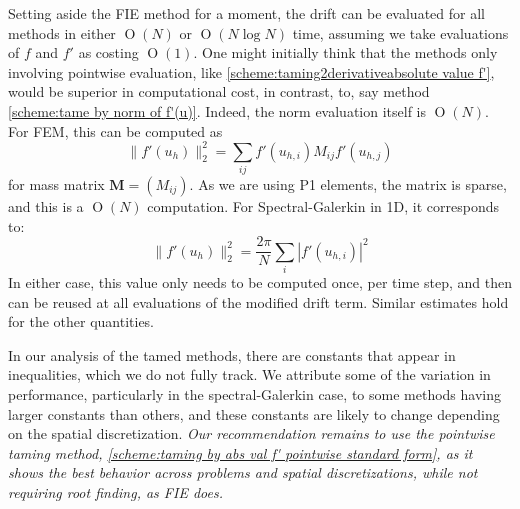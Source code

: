 \documentclass[reqno, 11pt]{amsart}
\newcommand{\gsnote}[1]{\textcolor{Cerulean}{#1}}
\theoremstyle{plain}
\theoremstyle{definition}
\theoremstyle{remark}
\numberwithin{equation}{section}
\numberwithin{theorem}{section}
\DeclareMathOperator{\bigo}{O}
\begin{document}
{Setting aside the FIE method for a moment, the drift can be evaluated for all methods in either $\bigo(N)$ or $\bigo(N\log N)$ time, assuming we take evaluations of $f$ and $f'$ as costing $\bigo(1)$.  One might initially think that the methods only involving pointwise evaluation, like \eqref{scheme:taming2derivativeabsolute value f'}, would be superior in computational cost, in contrast, to, say method \eqref{scheme:tame by norm of f'(u)}.  Indeed, the norm evaluation itself is $\bigo(N)$.  For FEM, this can be computed as
\begin{equation}
    \|f'(u_h)\|_2^2 = \sum_{ij} f'(u_{h,i})M_{ij} f'(u_{h,j})
\end{equation}
for mass matrix $\mathbf{M} = (M_{ij})$.  As we are using P1 elements, the matrix is sparse, and this is a $\bigo(N)$ computation.  For Spectral-Galerkin in 1D, it corresponds to:
\begin{equation}
    \|f'(u_h)\|_2^2  = \frac{2\pi}{N}\sum_i |f'(u_{h,i})|^2
\end{equation}
In either case, this value only needs to be computed once, per time step, and then can be reused at all evaluations of the modified drift term.  Similar estimates hold for the other quantities.

In our analysis of the tamed methods, there are  constants that appear in inequalities, which we do not fully track.  We attribute some of the variation in performance, particularly in the spectral-Galerkin case, to some methods having larger constants than others, and these constants are likely to change depending on the spatial discretization.  {\it Our recommendation remains to use the pointwise taming method, \eqref{scheme:taming by abs val f' pointwise standard form}, as it shows the best behavior across problems and spatial discretizations, while not requiring root finding, as FIE does.}



}
\end{document}
